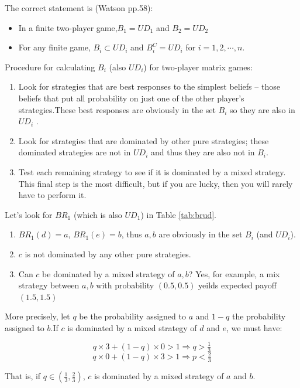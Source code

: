 \documentclass{article}
\begin{document}
\begin{mdframed}[backgroundcolor=blue!20,linecolor=white]
The correct statement is (Watson pp.58):

\begin{itemize}
\item In a finite two-player game,$B_1 = UD_1$ and $B_2 = UD_2$
\item For any finite game, $B_i \subset UD_i$ and $B^C_i = UD_i$ for $i = 1, 2,\cdots, n$.
\end{itemize}

Procedure for calculating $B_i$ (also $UD_i$) for two-player matrix games:

\begin{enumerate}
\item Look for strategies that are best responses to the simplest beliefs -- those beliefs that put all probability on just one of the other player's strategies.These best responses are obviously in the set $B_i$ so they are also in $UD_i$ .
\item Look for strategies that are dominated by other pure strategies; these dominated strategies are not in $UD_i$ and thus they are also not in $B_i$.
\item Test each remaining strategy to see if it is dominated by a mixed strategy. This final step is the most difficult, but if you are lucky, then you will rarely have to perform it.

\end{enumerate}

Let's look for $BR_1$ (which is also $UD_1$) in Table \ref{tab:brud}.

\begin{enumerate}
\item $BR_1(d)=a$, $BR_1(e)=b$, thus ${a,b}$ are obviously in the set $B_i$ (and $UD_i$).
\item ${c}$ is not dominated by any other pure strategies.
\item Can ${c}$ be dominated by a mixed strategy of $a,b$? Yes, for example, a mix strategy between ${a,b}$ with probability $(0.5,0.5)$ yeilds expected payoff $(1.5,1.5)$
\end{enumerate}

More precisely, let $q$ be the probability assigned to $a$ and $1-q$ the probability assigned to $b$.If ${c}$ is dominated by a mixed strategy of $d$ and $e$, we must have:

$$q\times 3 + (1-q)\times 0 > 1 \Rightarrow q > \tfrac13 $$
$$q\times 0 + (1-q)\times 3 >1 \Rightarrow p < \tfrac23 $$

That is, if $q\in (\tfrac13,\tfrac23)$, ${c}$ is dominated by a mixed strategy of $a$ and $b$.

\end{mdframed}
\end{document}
